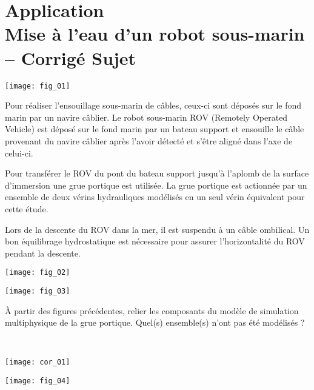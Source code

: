 \chapter*{Application  \\ 
Mise à l'eau d'un robot sous-marin -- \ifprof Corrigé \else Sujet \fi}
\ifprof {} \else  \fi
\setcounter{question}{0}

\begin{marginfigure}
\texttt{[image: fig\_01]}
\end{marginfigure}



\ifprof
\else
Pour réaliser l’ensouillage sous-marin de câbles, ceux-ci sont déposés sur le fond marin par un navire câblier. Le robot sous-marin ROV (Remotely Operated Vehicle) est déposé sur le fond marin par un bateau support et ensouille le câble provenant
du navire câblier après l’avoir détecté et s’être aligné dans l’axe de celui-ci.

Pour transférer le ROV du pont du bateau support jusqu’à l’aplomb de la surface d’immersion une grue portique est utilisée. 
La grue portique est actionnée par un ensemble de deux vérins hydrauliques modélisés en un seul vérin équivalent pour cette étude.

Lors de la descente du ROV dans la mer, il est suspendu à un câble ombilical. Un bon équilibrage hydrostatique est
nécessaire pour assurer l’horizontalité du ROV pendant la descente.


\begin{center}
\texttt{[image: fig\_02]}
\end{center}

\begin{center}
\texttt{[image: fig\_03]}
\end{center}
\fi

\begin{question}
À partir des figures précédentes, relier les composants du modèle de simulation
multiphysique de la grue portique. Quel(s) ensemble(s) n’ont pas été modélisés ?
\end{question}

\ifprof
\begin{corrige}~\\

\begin{center}
\texttt{[image: cor\_01]}
\end{center}
\end{corrige}
\else
\fi


\ifprof
\else
\begin{center}
\texttt{[image: fig\_04]}
\end{center}
\fi
